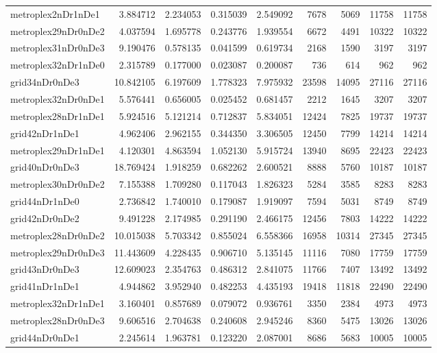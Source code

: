 \begin{longtable}{|l|r|r|r|r|r|r|r|r|}
metroplex2nDr1nDe1 & 3.884712 & 2.234053 & 0.315039 & 2.549092 & 7678 & 5069 & 11758 & 11758 \\
metroplex29nDr0nDe2 & 4.037594 & 1.695778 & 0.243776 & 1.939554 & 6672 & 4491 & 10322 & 10322 \\
metroplex31nDr0nDe3 & 9.190476 & 0.578135 & 0.041599 & 0.619734 & 2168 & 1590 & 3197 & 3197 \\
metroplex32nDr1nDe0 & 2.315789 & 0.177000 & 0.023087 & 0.200087 & 736 & 614 & 962 & 962 \\
grid34nDr0nDe3 & 10.842105 & 6.197609 & 1.778323 & 7.975932 & 23598 & 14095 & 27116 & 27116 \\
metroplex32nDr0nDe1 & 5.576441 & 0.656005 & 0.025452 & 0.681457 & 2212 & 1645 & 3207 & 3207 \\
metroplex28nDr1nDe1 & 5.924516 & 5.121214 & 0.712837 & 5.834051 & 12424 & 7825 & 19737 & 19737 \\
grid42nDr1nDe1 & 4.962406 & 2.962155 & 0.344350 & 3.306505 & 12450 & 7799 & 14214 & 14214 \\
metroplex29nDr1nDe1 & 4.120301 & 4.863594 & 1.052130 & 5.915724 & 13940 & 8695 & 22423 & 22423 \\
grid40nDr0nDe3 & 18.769424 & 1.918259 & 0.682262 & 2.600521 & 8888 & 5760 & 10187 & 10187 \\
metroplex30nDr0nDe2 & 7.155388 & 1.709280 & 0.117043 & 1.826323 & 5284 & 3585 & 8283 & 8283 \\
grid44nDr1nDe0 & 2.736842 & 1.740010 & 0.179087 & 1.919097 & 7594 & 5031 & 8749 & 8749 \\
grid42nDr0nDe2 & 9.491228 & 2.174985 & 0.291190 & 2.466175 & 12456 & 7803 & 14222 & 14222 \\
metroplex28nDr0nDe2 & 10.015038 & 5.703342 & 0.855024 & 6.558366 & 16958 & 10314 & 27345 & 27345 \\
metroplex29nDr0nDe3 & 11.443609 & 4.228435 & 0.906710 & 5.135145 & 11116 & 7080 & 17759 & 17759 \\
grid43nDr0nDe3 & 12.609023 & 2.354763 & 0.486312 & 2.841075 & 11766 & 7407 & 13492 & 13492 \\
grid41nDr1nDe1 & 4.944862 & 3.952940 & 0.482253 & 4.435193 & 19418 & 11818 & 22490 & 22490 \\
metroplex32nDr1nDe1 & 3.160401 & 0.857689 & 0.079072 & 0.936761 & 3350 & 2384 & 4973 & 4973 \\
metroplex28nDr0nDe3 & 9.606516 & 2.704638 & 0.240608 & 2.945246 & 8360 & 5475 & 13026 & 13026 \\
grid44nDr0nDe1 & 2.245614 & 1.963781 & 0.123220 & 2.087001 & 8686 & 5683 & 10005 & 10005 \\

\end{longtable}
